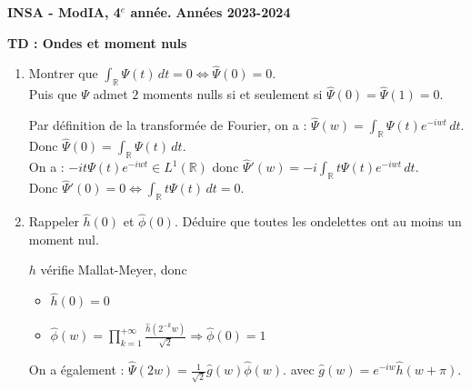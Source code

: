 \documentclass[12pt,a4paper]{article}
\newcommand{\entete}{
    \noindent\textbf{INSA - ModIA, 4$^e$ année.}
    \hfill \textbf{Années 2023-2024}
    
    \begin{center}
        \textbf{\LARGE TD : Ondes et moment nuls}
    \end{center}
}
\begin{document}
\entete

\vspace{0.5cm}

\begin{enumerate}
    \item Montrer que $\int_{\mathbb{R}} \Psi(t) \, dt = 0 \Leftrightarrow \hat{\Psi}(0) = 0$. \\
    Puis que $\Psi$ admet $2$ moments nulls si et seulement si $\hat{\Psi}(0) = \hat{\Psi}(1) = 0$. \\


    \color{blue}

    Par définition de la transformée de Fourier, on a : $\hat{\Psi}(w) = \int_{\mathbb{R}} \Psi(t) e^{-i wt} \, dt$. \\
    Donc $\hat{\Psi}(0) = \int_{\mathbb{R}} \Psi(t) \, dt$. \\

    On a : $-it \Psi(t) e^{-iwt} \in L^1(\mathbb{R})$ donc $\hat{\Psi}'(w) = -i \int_{\mathbb{R}} t \Psi(t) e^{-iwt} \, dt$. \\
    Donc $\hat{\Psi}'(0) = 0 \Leftrightarrow \int_{\mathbb{R}} t \Psi(t) \, dt = 0$. \\


    \color{black}

    \item Rappeler $\hat{h}(0)$ et $\hat{\phi}(0)$. Déduire que toutes les ondelettes ont au moins un moment nul. \\
    

    \color{blue}

    $h$ vérifie Mallat-Meyer, donc
    \begin{itemize}
        \item $\hat{h}(0) = 0$
        \item $\hat{\phi}(w) = \prod_{k=1}^{+\infty} \frac{\hat{h}(2^{-k}w)}{\sqrt{2}} \Rightarrow \hat{\phi}(0) = 1$
    \end{itemize}

    On a également : $\hat{\Psi}(2w) = \frac{1}{\sqrt{2}} \hat{g}(w) \hat{\phi}(w)$. avec $\hat{g}(w) = e^{-i w}\hat{h}(w+\pi)$. \\

\end{enumerate}
\end{document}
